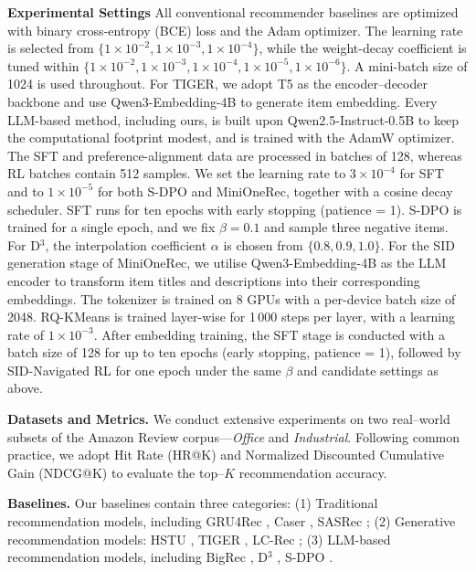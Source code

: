 \textbf{Experimental Settings}
All conventional recommender baselines are optimized with binary cross-entropy (BCE) loss and the Adam optimizer.  
The learning rate is selected from $\{1\!\times\!10^{-2}, 1\!\times\!10^{-3}, 1\!\times\!10^{-4}\}$, while the weight-decay coefficient is tuned within $\{1\!\times\!10^{-2}, 1\!\times\!10^{-3}, 1\!\times\!10^{-4}, 1\!\times\!10^{-5}, 1\!\times\!10^{-6}\}$.  
A mini-batch size of 1024 is used throughout.  
For TIGER, we adopt T5 \citep{T5} as the encoder–decoder backbone and use Qwen3-Embedding-4B to generate item embedding.  
Every LLM-based method, including ours, is built upon Qwen2.5-Instruct-0.5B \citep{qwen2.5} to keep the computational footprint modest, and is trained with the AdamW optimizer.  
The SFT and preference-alignment data are processed in batches of 128, whereas RL batches contain 512 samples.  
We set the learning rate to $3\!\times\!10^{-4}$ for SFT and to $1\!\times\!10^{-5}$ for both S-DPO and MiniOneRec, together with a cosine decay scheduler.  
SFT runs for ten epochs with early stopping (patience = 1). S-DPO is trained for a single epoch, and we fix $\beta=0.1$ and sample three negative items. For D$^{3}$, the interpolation coefficient $\alpha$ is chosen from $\{0.8, 0.9, 1.0\}$.  
For the SID generation stage of MiniOneRec, we utilise Qwen3-Embedding-4B as the LLM encoder to transform item titles and descriptions into their corresponding embeddings. The tokenizer is trained on 8 GPUs with a per-device batch size of 2048. RQ-KMeans is trained layer-wise for 1\,000 steps per layer, with a learning rate of $1\!\times\!10^{-3}$. After embedding training, the SFT stage is conducted with a batch size of 128 for up to ten epochs (early stopping, patience = 1), followed by SID-Navigated RL for one epoch under the same $\beta$ and candidate settings as above.

\textbf{Datasets and Metrics.} 
We conduct extensive experiments on two real–world subsets of the Amazon Review corpus—\textit{Office} and \textit{Industrial}.  
Following common practice, we adopt Hit Rate (HR@K) and Normalized Discounted Cumulative Gain (NDCG@K) to evaluate the top–$K$ recommendation accuracy. 

\textbf{Baselines.} 
Our baselines contain three categories: (1) Traditional recommendation models, including GRU4Rec \citep{GRU4Rec}, Caser \citep{Caser}, SASRec \citep{SASRec}; (2) Generative recommendation models: HSTU \citep{HSTU}, TIGER \citep{TIGER}, LC-Rec \citep{LCRec}; (3) LLM-based recommendation models, including BigRec \citep{BIGRec}, D$^3$ \citep{D3}, S-DPO \citep{sdpo}.


